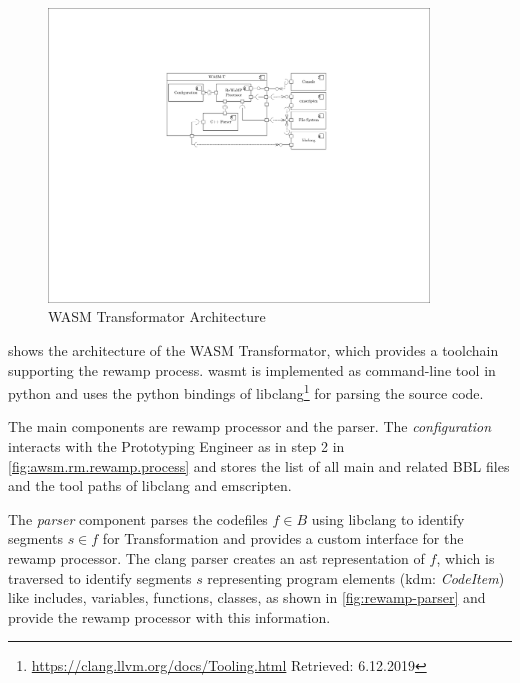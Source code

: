 \begin{figure}[h!]
\hypertarget{fig:awsm.rm.wasmt.architecture}{%
\centering
\includegraphics[width=0.9\textwidth]{../figures/awsm-rm-wasmt-architecture.pdf}
\caption{WASM Transformator Architecture}\label{fig:awsm.rm.wasmt.architecture}
}
\end{figure}

 shows the architecture of the WASM Transformator, which provides a toolchain supporting the \gls{rewamp} process.
\gls{wasmt} is implemented as command-line tool in python and uses the python bindings of libclang\footnote{\url{https://clang.llvm.org/docs/Tooling.html} Retrieved: 6.12.2019} for parsing the  source code.

The main components are \gls{rewamp} processor and the \cpp parser.
The \emph{configuration} interacts with the Prototyping Engineer as in step 2 in \cref{fig:awsm.rm.rewamp.process} and stores the list of all main and related BBL files and the tool paths of libclang and emscripten.

The \emph{\cpp parser} component parses the codefiles \(f\in B\) using libclang to identify segments \(s \in f\) for \gls{Transformation} and provides a custom interface for the \gls{rewamp} processor.
The clang parser creates an \gls{ast} representation of \(f\), which is traversed to identify segments \(s\) representing program elements (\gls{kdm}: \emph{CodeItem}) like includes, variables, functions, classes, as shown in \cref{fig:rewamp-parser} and provide the \gls{rewamp} processor with this information.

